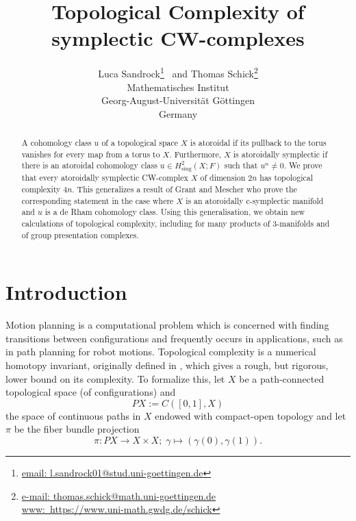 \documentclass[a4paper,twoside]{article}
\theoremstyle{plain}
\theoremstyle{definition}
\theoremstyle{remark}
\DeclareMathOperator{\sing}{sing}
\begin{document}
\pagestyle{myheadings}


\title{Topological Complexity of
  symplectic CW-complexes}

\author{Luca
  Sandrock\thanks{\protect\href{mailto:l.sandrock01@stud.uni-goettingen.de}{email:
      l.sandrock01@stud.uni-goettingen.de}} \ and Thomas Schick\thanks{
\protect\href{mailto:thomas.schick@math.uni-goettingen.de}{e-mail:
  thomas.schick@math.uni-goettingen.de}
\protect\\
\protect\href{https://www.uni-math.gwdg.de/schick}{www:~https://www.uni-math.gwdg.de/schick}}\\
Mathematisches Institut\\
Georg-August-Universit\"at G{\"o}ttingen\\
Germany}

\date{}
\maketitle

\begin{abstract}
  A cohomology class $u$ of a topological space $X$ is atoroidal if its pullback to the torus vanishes for every
  map from a torus to $X$. Furthermore, $X$ is  atoroidally symplectic if there is an atoroidal
  cohomology class $u\in H^2_{\sing}(X;F)$ such that $u^n \ne 0$.
  We prove that every atoroidally symplectic CW-complex $X$ of dimension $2n$ has topological complexity $4n$.
  This generalizes a result of Grant and Mescher who prove the corresponding statement in the case where $X$ is an
  atoroidally c-symplectic manifold and $u$ is a de Rham cohomology class.
  Using this generalisation, we obtain new calculations of topological complexity, including for many
  products of 3-manifolds and of group presentation complexes.
\end{abstract}


\section{Introduction}

Motion planning is a computational problem which is concerned with finding transitions between configurations and
frequently occurs in applications, such as in path planning for robot motions.
Topological complexity is a numerical homotopy invariant, originally defined in \cite{Farber}, which gives a rough,
but rigorous, lower bound on its complexity. To formalize this, let $X$ be a path-connected topological space (of
configurations) and
\begin{equation*}
  PX:= C([0,1],X)
\end{equation*}
the space of continuous paths in $X$ endowed with compact-open topology and let $\pi$ be the fiber bundle projection
\begin{equation*}
  \pi\colon PX \to X\times X; \; \gamma\mapsto (\gamma(0),\gamma(1)).
\end{equation*}
\end{document}
